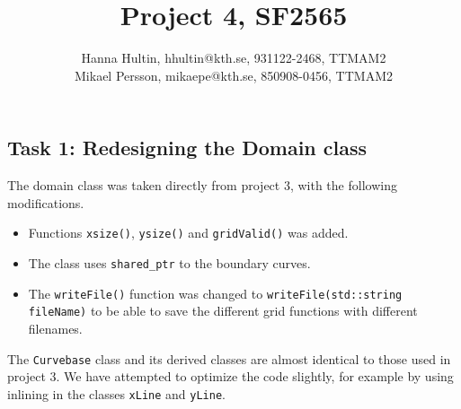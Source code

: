 \documentclass[a4paper,10pt]{article}
\title{Project 4, SF2565}
\author{Hanna Hultin, hhultin@kth.se, 931122-2468, TTMAM2 \\ Mikael Persson, mikaepe@kth.se, 850908-0456, TTMAM2}
\begin{document}
\maketitle

\subsection*{Task 1: Redesigning the Domain class}
The domain class was taken directly from project 3, with the following modifications. 
\begin{itemize}
  \item
    Functions \texttt{xsize()}, \texttt{ysize()} and \texttt{gridValid()} was added.
  \item The class uses \texttt{shared\_ptr} to the boundary curves. 
  \item
    The \texttt{writeFile()} function was changed to 
    \texttt{writeFile(std::string fileName)} to be able to save the 
    different grid functions with different filenames.
\end{itemize}
The \texttt{Curvebase} class and its derived classes are almost identical to those used in 
project 3. We have attempted to optimize the code slightly, for example by using inlining 
in the classes \texttt{xLine} and \texttt{yLine}.
\end{document}
